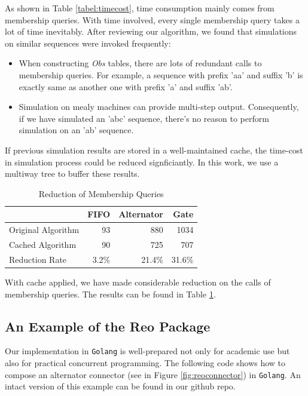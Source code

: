 \documentclass[conference, a4paper]{IEEEtran}
\begin{document}
As shown in Table \ref{tabel:timecost}, time consumption mainly comes from membership queries.
With time involved, every single membership query takes a lot of time inevitably.
After reviewing our algorithm, we found that simulations on similar sequences were invoked frequently:

\begin{itemize}
  \item When constructing \emph{Obs} tables, there are lots of redundant calls to membership
    queries. For example, a sequence with prefix 'aa' and suffix 'b' is exactly same as another one
    with prefix 'a' and suffix 'ab'.
  \item Simulation on mealy machines can provide multi-step output. Consequently, if we have
    simulated an 'abc' sequence, there's no reason to perform simulation on an 'ab' sequence.
\end{itemize}

If previous simulation results are stored in a well-maintained cache, the time-cost in
simulation process could be reduced signficiantly. In this work, we use a multiway tree to buffer
these results.

\begin{table}[ht]
  \renewcommand{\arraystretch}{1.3}
  \caption{Reduction of Membership Queries}
  \label{tabel:cacheoptimization}
  \centering
  \begin{tabular}{l||rrr}
    \hline
    & FIFO & Alternator & Gate \\
    \hline\hline
    Original Algorithm & 93 & 880 & 1034 \\
    Cached Algorithm & 90 & 725 & 707 \\
    Reduction Rate & 3.2\% & 21.4\% & 31.6\% \\
    \hline
  \end{tabular}
\end{table}

With cache applied, we have made considerable reduction on the calls of membership queries. The results
can be found in Table \ref{tabel:cacheoptimization}.

\subsection{An Example of the Reo Package }
\label{sec:reolib}

Our implementation in \texttt{Golang} is well-prepared not only for academic use
but also for practical concurrent programming. The following code shows how to compose an alternator
connector (see in Figure \ref{fig:reoconnector}) in \texttt{Golang}. An intact version of this example
can be found in our github repo.
\end{document}
